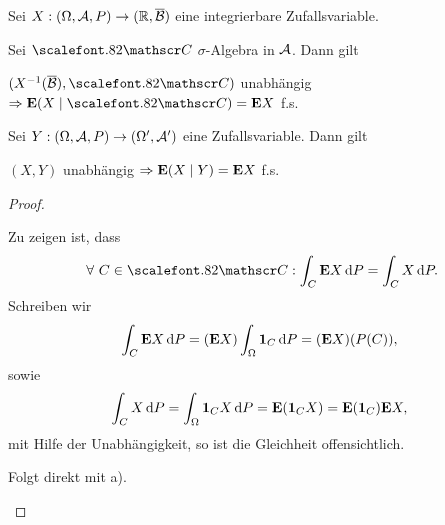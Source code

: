 \begin{bem}[Bemerkungen.]
\label{bem:10.2}
Sei $X : (\Omega, {\AA},P)\to (\R, \overline{\BB})$ eine integrierbare
Zufallsvariable.
\begin{bemenum}
\item Sei ${\CC}$ $\sigma$-Algebra in ${\AA}$. Dann gilt

$(X^ {-1}(\overline{\BB}), {\CC})$ unabhängig $\Rightarrow \E(X \mid {\CC}) =
\E X$ f.s.
\item
Sei $Y: (\Omega, {\AA}, P) \to (\Omega', {\AA}')$ eine Zufallsvariable. Dann
gilt

$(X,Y)$ unabhängig $ \Rightarrow \E(X\mid Y) =\E X $ f.s.\maphere
\end{bemenum}
\end{bem}
\begin{proof}
\begin{bemenum}
\item Zu zeigen ist, dass
\begin{align*}
\forall C\in\CC : \int_C \E X \dP = \int_C X \dP. 
\end{align*}
Schreiben wir
\begin{align*}
\int_C \E X \dP = (\E X)\int_\Omega \Id_C \dP = (\E X)(P(C)),
\end{align*}
sowie
\begin{align*}
\int_C X\dP = \int_\Omega \Id_C X\dP = \E(\Id_C X) = \E(\Id_C)\E X,
\end{align*}
mit Hilfe der Unabhängigkeit, so ist die Gleichheit offensichtlich.
\item Folgt direkt mit a).\qedhere
\end{bemenum}
\end{proof}

